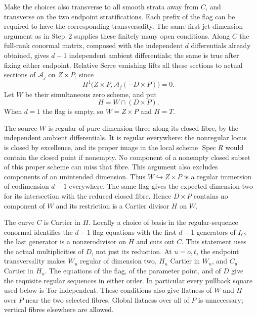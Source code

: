 Make the choices also transverse to all smooth strata away from
$C$, and transverse on the two endpoint stratifications.  Each
prefix of the flag can be required to have the corresponding
transversality.  The same first-jet dimension argument as in
Step~2 supplies these finitely many open conditions.  Along $C$
the full-rank conormal matrix, composed with the independent
$d$ differentials already obtained, gives $d-1$ independent
ambient differentials; the same is true after fixing either
endpoint.  Relative Serre vanishing lifts all these sections to
actual sections of $\mathcal A_j$ on $Z\times P$, since
\[
 H^1\bigl(Z\times P,\mathcal A_j(-D\times P)\bigr)=0.
\]
Let $W$ be their simultaneous zero scheme, and put
\begin{equation}
              H=W\cap(D\times P).                    \tag{AE.7}
\end{equation}
When $d=1$ the flag is empty, so $W=Z\times P$ and $H=T$.

The source $W$ is regular of pure dimension three along its
closed fibre, by the independent ambient differentials.  It
is regular everywhere: the nonregular locus is closed by
excellence, and its proper image in the local scheme
$\operatorname{Spec}R$ would contain the closed point if
nonempty.  No component of a nonempty closed subset of this
proper scheme can miss that fibre.  This argument also excludes
components of an unintended dimension.  Thus
$W\hookrightarrow Z\times P$ is a regular immersion of
codimension $d-1$ everywhere.  The same flag gives the expected
dimension two for its intersection with the reduced closed
fibre.  Hence $D\times P$ contains no component of $W$ and its
restriction is a Cartier divisor $H$ on $W$.

The curve $C$ is Cartier in $H$.  Locally a choice of basis in
the regular-sequence conormal identifies the $d-1$ flag equations
with the first $d-1$ generators of $I_C$; the last generator
is a nonzerodivisor on $H$ and cuts out $C$.  This statement
uses the actual multiplicities of $D$, not just its reduction.
At $u=o,t$, the endpoint transversality makes $W_u$ regular of
dimension two, $H_u$ Cartier in $W_u$, and $C_u$ Cartier in
$H_u$.  The equations of the flag, of the parameter point, and
of $D$ give the requisite regular sequences in either order.
In particular every pullback square used below is
Tor-independent.  These conditions also give flatness of $W$
and $H$ over $P$ near the two selected fibres.  Global flatness
over all of $P$ is unnecessary; vertical fibres elsewhere are
allowed.

